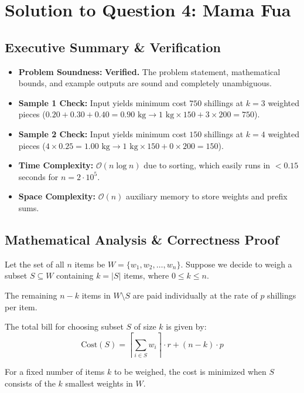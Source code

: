 \documentclass[a4paper,12pt]{article}
\begin{document}
\fi

\section*{Solution to Question 4: Mama Fua}

\subsection*{Executive Summary \& Verification}
\begin{itemize}
    \item \textbf{Problem Soundness:} \textbf{Verified.} The problem statement, mathematical bounds, and example outputs are sound and completely unambiguous.
    \item \textbf{Sample 1 Check:} Input yields minimum cost $750$ shillings at $k=3$ weighted pieces ($0.20 + 0.30 + 0.40 = 0.90 \text{ kg} \to 1 \text{ kg} \times 150 + 3 \times 200 = 750$).
    \item \textbf{Sample 2 Check:} Input yields minimum cost $150$ shillings at $k=4$ weighted pieces ($4 \times 0.25 = 1.00 \text{ kg} \to 1 \text{ kg} \times 150 + 0 \times 200 = 150$).
    \item \textbf{Time Complexity:} $\mathcal{O}(n \log n)$ due to sorting, which easily runs in $<0.15$ seconds for $n = 2 \cdot 10^5$.
    \item \textbf{Space Complexity:} $\mathcal{O}(n)$ auxiliary memory to store weights and prefix sums.
\end{itemize}

\subsection*{Mathematical Analysis \& Correctness Proof}

Let the set of all $n$ items be $W = \{w_1, w_2, \ldots, w_n\}$. Suppose we decide to weigh a subset $S \subseteq W$ containing $k = |S|$ items, where $0 \le k \le n$. 

The remaining $n - k$ items in $W \setminus S$ are paid individually at the rate of $p$ shillings per item.

The total bill for choosing subset $S$ of size $k$ is given by:
\[
\text{Cost}(S) = \left\lceil \sum_{i \in S} w_i \right\rceil \cdot r + (n - k) \cdot p
\]

\begin{lemma}
For a fixed number of items $k$ to be weighed, the cost is minimized when $S$ consists of the $k$ smallest weights in $W$.
\end{lemma}
\end{document}

